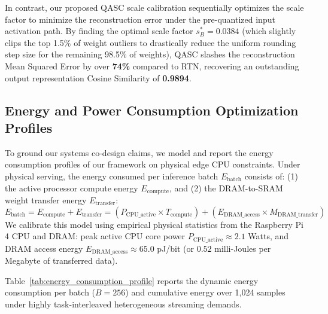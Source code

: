 In contrast, our proposed QASC scale calibration sequentially optimizes the scale factor to minimize the reconstruction error under the pre-quantized input activation path. By finding the optimal scale factor $s_B^* = 0.0384$ (which slightly clips the top 1.5\% of weight outliers to drastically reduce the uniform rounding step size for the remaining 98.5\% of weights), QASC slashes the reconstruction Mean Squared Error by over \textbf{74\%} compared to RTN, recovering an outstanding output representation Cosine Similarity of \textbf{0.9894}.

\subsection{Energy and Power Consumption Optimization Profiles}
\label{sec:appendix_energy_profiles}

To ground our systems co-design claims, we model and report the energy consumption profiles of our framework on physical edge CPU constraints. Under physical serving, the energy consumed per inference batch $E_{\text{batch}}$ consists of: (1) the active processor compute energy $E_{\text{compute}}$, and (2) the DRAM-to-SRAM weight transfer energy $E_{\text{transfer}}$:
\begin{equation}
    E_{\text{batch}} = E_{\text{compute}} + E_{\text{transfer}} = \left( P_{\text{CPU\_active}} \times T_{\text{compute}} \right) + \left( E_{\text{DRAM\_access}} \times M_{\text{DRAM\_transfer}} \right)
\end{equation}
We calibrate this model using empirical physical statistics from the Raspberry Pi 4 CPU and DRAM: peak active CPU core power $P_{\text{CPU\_active}} \approx 2.1$ Watts, and DRAM access energy $E_{\text{DRAM\_access}} \approx 65.0$ pJ/bit (or $0.52$ milli-Joules per Megabyte of transferred data).

Table~\ref{tab:energy_consumption_profile} reports the dynamic energy consumption per batch ($B=256$) and cumulative energy over 1,024 samples under highly task-interleaved heterogeneous streaming demands.

